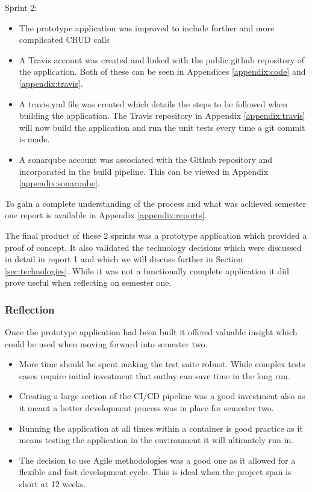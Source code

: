 Sprint 2:
\begin{itemize}
	\item The prototype application was improved to include further and more complicated \gls{CRUD} calls
	\item A \gls{Travis} account was created and linked with the public \gls{github} repository of the application. Both of these can be seen in Appendices \ref{appendix:code} and \ref{appendix:travis}.
	\item A travis.yml file was created which details the steps to be followed when building the application. The Travis repository in Appendix \ref{appendix:travis} will now build the application and run the unit tests every time a \gls{git} commit is made.
	\item A \gls{sonarqube} account was associated with the Github repository and incorporated in the build pipeline. This can be viewed in Appendix \ref{appendix:sonarqube}.
\end{itemize}
	
To gain a complete understanding of the process and what was achieved semester one report is available in Appendix \ref{appendix:reports}.
	
The final product of these 2 sprints was a prototype application which provided a proof of concept. It also validated the technology decisions which were discussed in detail in report 1 and which we will discuss further in Section \ref{sec:technologies}. While it was not a functionally complete application it did prove useful when reflecting on semester one.
	
\subsubsection{Reflection}
Once the prototype application had been built it offered valuable insight which could be used when moving forward into semester two.

\begin{itemize}
	\item More time should be spent making the test suite robust. While complex tests cases require initial investment that outlay can save time in the long run.
	\item Creating a large section of the CI/CD pipeline was a good investment also as it meant a better development process was in place for semester two.
	\item Running the application at all times within a container is good practice as it means testing the application in the environment it will ultimately run in.
	\item The decision to use Agile methodologies was a good one as it allowed for a flexible and fast development cycle. This is ideal when the project span is short at 12 weeks.
\end{itemize}

